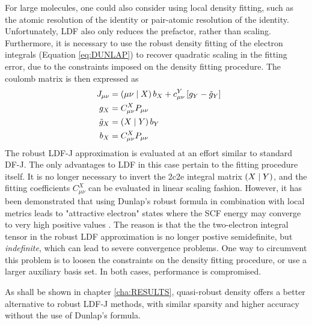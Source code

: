 For large molecules, one could also consider using local density fitting, such as the atomic resolution of the identity or pair-atomic resolution of the identity. Unfortunately, LDF also only reduces the prefactor, rather than scaling. Furthermore, it is necessary to use the robust density fitting of the electron integrals (Equation \ref{eq:DUNLAP}) to recover quadratic scaling in the fitting error, due to the constraints imposed on the density fitting procedure. The coulomb matrix is then expressed as
\begin{align}
J_{\mu\nu} &= \left( \mu\nu \mid X \right) b_X + c^Y_{\mu\nu} \left[ g_Y - \tilde{g}_Y \right] \\
g_X &= C^X_{\mu\nu} P_{\mu\nu} \\
\tilde{g}_X &= \left( X \mid Y \right) b_{Y} \\ 
\quad b_{X} &= C_{\mu\nu}^{X} P_{\mu\nu} 
\end{align}
\noindent The robust LDF-J approximation is evaluated at an effort similar to standard DF-J. The only advantages to LDF in this case pertain to the fitting procedure itself. It is no longer necessary to invert the 2c2e integral matrix $\left( X \mid Y \right)$, and the fitting coefficients $C_{\mu\nu}^{X}$ can be evaluated in linear scaling fashion. However, it has been demonstrated that using Dunlap's robust formula in combination with local metrics leads to "attractive electron" states where the SCF energy may converge to very high positive values \cite{Mer2013,Hol2014}. The reason is that the the two-electron integral tensor in the robust LDF approximation is no longer postive semidefinite, but \emph{indefinite}, which can lead to severe convergence problems. One way to circumvent this problem is to loosen the constraints on the density fitting procedure, or use a larger auxiliary basis set. In both cases, performance is compromised.  

As shall be shown in chapter \ref{cha:RESULTS}, quasi-robust density offers a better alternative to robust LDF-J methods, with similar sparsity and higher accuracy without the use of Dunlap's formula.




